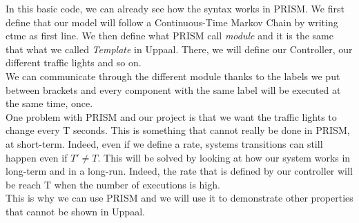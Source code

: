 \noindent In this basic code, we can already see how the syntax works in PRISM. We first define that our model will follow a Continuous-Time Markov Chain by writing ctmc as first line. We then define what PRISM call \textit{module} and it is the same that what we called \textit{Template} in Uppaal. There, we will define our Controller, our different traffic lights and so on. \\
We can communicate through the different module thanks to the labels we put between brackets and every component with the same label will be executed at the same time, once. \\
One problem with PRISM and our project is that we want the traffic lights to change every T seconds. This is something that cannot really be done in PRISM, at short-term. Indeed, even if we define a rate, systems transitions can still happen even if $T' \ne T $. This will be solved by looking at how our system works in long-term and in a long-run. Indeed, the rate that is defined by our controller will be reach T when the number of executions is high. \\ 
This is why we can use PRISM and we will use it to demonstrate other properties that cannot be shown in Uppaal.

